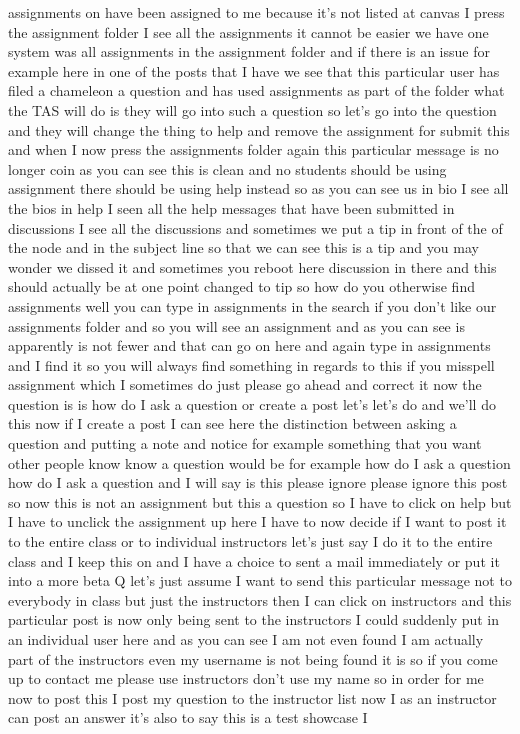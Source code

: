 assignments on have been assigned to me because it's not listed at canvas I press the assignment folder I see all the assignments it cannot be easier we have one system was all assignments in the assignment folder and if there is an issue for example here in one of the posts that I have we see that this particular user has filed a chameleon a question and has used assignments as part of the folder what the TAS will do is they will go into such a question so let's go into the question and they will change the thing to help and remove the assignment for submit this and when I now press the assignments folder again this particular message is no longer coin as you can see this is clean and no students should be using assignment there should be using help instead so as you can see us in bio I see all the bios in help I seen all the help messages that have been submitted in discussions I see all the discussions and sometimes we put a tip in front of the of the node and in the subject line so that we can see this is a tip and you may wonder we dissed it and sometimes you reboot here discussion in there and this should actually be at one point changed to tip so how do you otherwise find assignments well you can type in assignments in the search if you don't like our assignments folder and so you will see an assignment and as you can see is apparently is not fewer and that can go on here and again type in assignments and I find it so you will always find something in regards to this if you misspell assignment which I sometimes do just please go ahead and correct it now the question is is how do I ask a question or create a post let's let's do and we'll do this now if I create a post I can see here the distinction between asking a question and putting a note and notice for example something that you want other people know know a question would be for example how do I ask a question how do I ask a question and I will say is this please ignore please ignore this post so now this is not an assignment but this a question so I have to click on help but I have to unclick the assignment up here I have to now decide if I want to post it to the entire class or to individual instructors let's just say I do it to the entire class and I keep this on and I have a choice to sent a mail immediately or put it into a more beta Q let's just assume I want to send this particular message not to everybody in class but just the instructors then I can click on instructors and this particular post is now only being sent to the instructors I could suddenly put in an individual user here and as you can see I am not even found I am actually part of the instructors even my username is not being found it is so if you come up to contact me please use instructors don't use my name so in order for me now to post this I post my question to the instructor list now I as an instructor can post an answer it's also to say this is a test showcase I


